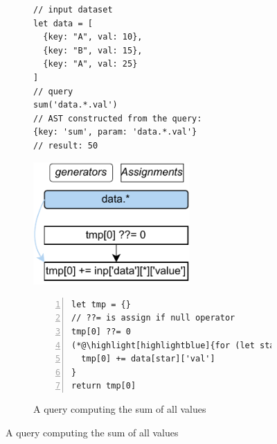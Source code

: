 \documentclass[runningheads]{llncs}
\begin{document}
\begin{figure}[t!]
\begin{subfigure}{\textwidth}
\begin{minipage}{0.3\textwidth}
\begin{lstlisting}[style=JavaScriptTiny, columns=flexible]
// input dataset
let data = [
  {key: "A", val: 10},
  {key: "B", val: 15},
  {key: "A", val: 25}
]
// query
sum('data.*.val')
// AST constructed from the query:
{key: 'sum', param: 'data.*.val'}
// result: 50
\end{lstlisting}
\end{minipage}
\begin{minipage}{0.3\textwidth}
\hspace{3.6mm}
\includegraphics[width=0.657\textwidth]{images/intro_q1_ir.pdf}
\end{minipage}
\begin{minipage}{0.38\textwidth}
\begin{lstlisting}[style=JavaScriptTiny, columns=flexible, numbers=left, xleftmargin=2pt]
let tmp = {}
// ??= is assign if null operator
tmp[0] ??= 0
(*@\highlight[highlightblue]{for (let star in data) }@*) {
  tmp[0] += data[star]['val']
}
return tmp[0]
\end{lstlisting}
\end{minipage}
\vspace{-4mm}
\caption{A query computing the sum of all values}\label{fig:intro_q1}
\end{subfigure}


\end{figure}
\end{document}
